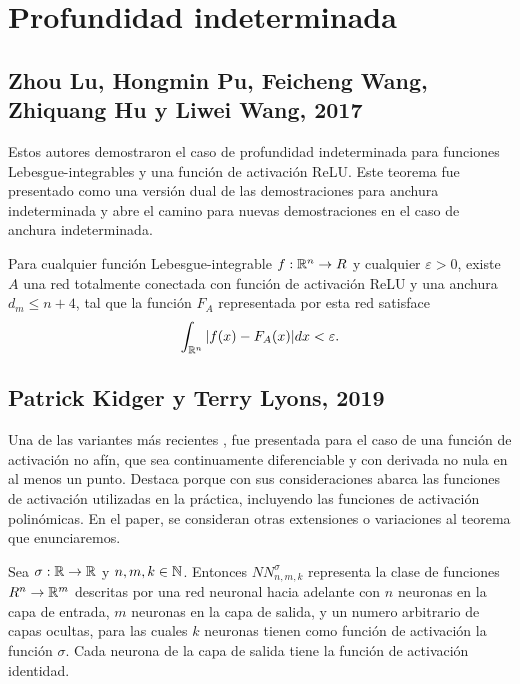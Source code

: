 \section{Profundidad indeterminada}

\subsection{Zhou Lu, Hongmin Pu, Feicheng Wang, Zhiquang Hu y Liwei Wang, 2017}
Estos autores demostraron \cite{2017arXiv170902540L} el caso de profundidad indeterminada para funciones Lebesgue-integrables y una función de activación ReLU. Este teorema fue presentado como una versión dual de las demostraciones para anchura indeterminada y abre el camino para nuevas demostraciones en el caso de anchura indeterminada.

\begin{teorema}
Para cualquier función Lebesgue-integrable $f:\mathbb{R}^n\to R$ y cualquier $\varepsilon>0$, existe $A$ una red totalmente conectada con función de activación ReLU y una anchura $d_m\leq n+4$, tal que la función $F_A$ representada por esta red satisface $$\int_{\mathbb{R}^n}|f(x)-F_A(x)|dx<\varepsilon.$$
\end{teorema}

\subsection{Patrick Kidger y Terry Lyons, 2019}
Una de las variantes más recientes \cite{2019arXiv190508539K}, fue presentada para el caso de una función de activación no afín, que sea continuamente diferenciable y con derivada no nula en al menos un punto. Destaca porque con sus consideraciones abarca las funciones de activación utilizadas en la práctica, incluyendo las funciones de activación polinómicas. En el paper, se consideran otras extensiones o variaciones al teorema que enunciaremos.\\

\begin{definicion}
Sea $\sigma:\mathbb{R}\to\mathbb{R}$ y $n,m,k\in\mathbb{N}$. Entonces $NN_{n,m,k}^\sigma$ representa la clase de funciones $R^n\to \mathbb{R}^m$ descritas por una red neuronal hacia adelante con $n$ neuronas en la capa de entrada, $m$ neuronas en la capa de salida, y un numero arbitrario de capas ocultas, para las cuales $k$ neuronas tienen como función de activación la función $\sigma$. Cada neurona de la capa de salida tiene la función de activación identidad.
\end{definicion}

